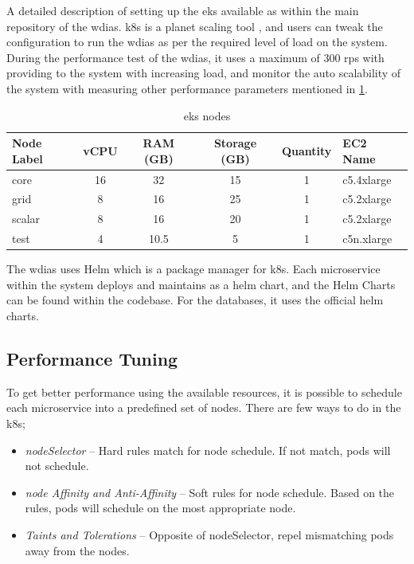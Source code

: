 A detailed description of setting up the \acrshort{eks} available as \cite{KarunarathneWdias/Amazon_EKS.md:EKS} within the main repository of the \acrshort{wdias}.
\acrshort{k8s} is a planet scaling tool \cite{LinuxFoundationProduction-GradeKubernetes}, and users can tweak the configuration to run the \acrshort{wdias} as per the required level of load on the system. During the performance test of the \acrshort{wdias}, it uses a maximum of 300 \acrshort{rps} with providing to the system with increasing load, and monitor the auto scalability of the system with measuring other performance parameters mentioned in \cref{tab:aws_eks_nodes}.

\begin{table}[ht]
\centering
\caption{\acrshort{eks} nodes}
\footnotesize
\begin{tabular}{|l|c|c|c|c|l|}
\hline
\textbf{Node Label} & \textbf{vCPU} & \textbf{RAM (GB)} & \textbf{Storage (GB)} & \textbf{Quantity} & \textbf{EC2 Name} \\ \hline
core & 16 & 32 & 15 & 1 & c5.4xlarge \\ \hline
grid & 8 & 16 & 25 & 1 & c5.2xlarge \\ \hline
scalar & 8 & 16 & 20 & 1 & c5.2xlarge \\ \hline
test & 4 & 10.5 & 5 & 1 & c5n.xlarge \\ \hline
\end{tabular}
\label{tab:aws_eks_nodes}
\end{table}

The \acrshort{wdias} uses Helm \cite{CNCFHelmDocs} which is a package manager for \acrshort{k8s}. Each microservice within the system deploys and maintains as a helm chart, and the Helm Charts \cite{KarunarathneWdias-helm-charts:Deployments} can be found within the codebase. For the databases, it uses the official helm charts.


\subsection{Performance Tuning}
\label{se:performance_tuning}
To get better performance using the available resources, it is possible to schedule each microservice into a predefined set of nodes. There are few ways to do in the \acrshort{k8s};
\begin{itemize}
    \item \emph{nodeSelector} -- Hard rules match for node schedule. If not match, pods will not schedule.
    \item \emph{node Affinity and Anti-Affinity} -- Soft rules for node schedule. Based on the rules, pods will schedule on the most appropriate node.
    \item \emph{Taints and Tolerations} -- Opposite of nodeSelector, repel mismatching pods away from the nodes.
\end{itemize}

